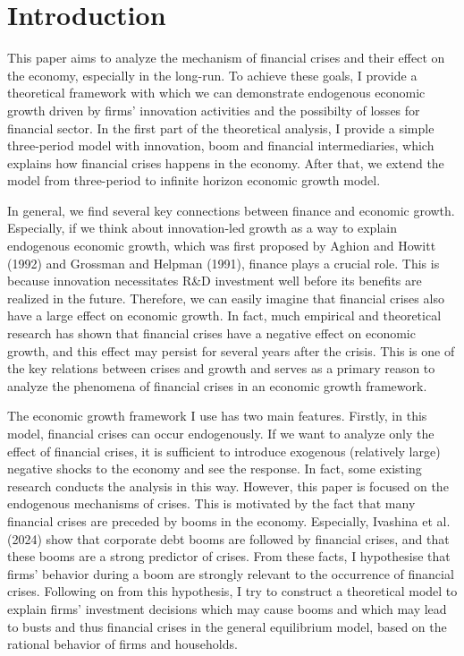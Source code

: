 \documentclass[a4paper,12pt]{article}
\begin{document}
\section{Introduction}
This paper aims to analyze the mechanism of financial crises and their effect on the economy, especially in the long-run. To achieve these goals, I provide a theoretical framework with which we can demonstrate endogenous economic growth driven by firms' innovation activities and the possibilty of losses for financial sector. In the first part of the theoretical analysis, I provide a simple three-period model with innovation, boom and financial intermediaries, which explains how financial crises happens in the economy. After that, we extend the model from three-period to infinite horizon economic growth model.  \par
In general, we find several key connections between finance and economic growth. Especially, if we think about innovation-led growth as a way to explain endogenous economic growth, which was first proposed by Aghion and Howitt (1992) and Grossman and Helpman (1991), finance plays a crucial role. This is because innovation necessitates R\&D investment well before its benefits are realized in the future. Therefore, we can easily imagine that financial crises also have a large effect on economic growth. In fact, much empirical and theoretical research has shown that financial crises have a negative effect on economic growth, and this effect may persist for several years after the crisis. This is one of the key relations between crises and growth and serves as a primary reason to analyze the phenomena of financial crises in an economic growth framework. \par
The economic growth framework I use has two main features. Firstly, in this model, financial crises can occur endogenously. If we want to analyze only the effect of financial crises, it is sufficient to introduce exogenous (relatively large) negative shocks to the economy and see the response. In fact, some existing research conducts the analysis in this way. However, this paper is focused on the endogenous mechanisms of crises. This is motivated by the fact that many financial crises are preceded by booms in the economy. Especially, Ivashina et al. (2024) show that corporate debt booms are followed by financial crises, and that these booms are a strong predictor of crises. From these facts, I hypothesise that firms' behavior during a boom are strongly relevant to the occurrence of financial crises. Following on from this hypothesis, I try to construct a theoretical model to explain firms' investment decisions which may cause booms and which may lead to busts and thus financial crises in the general equilibrium model, based on the rational behavior of firms and households. \par
\end{document}
